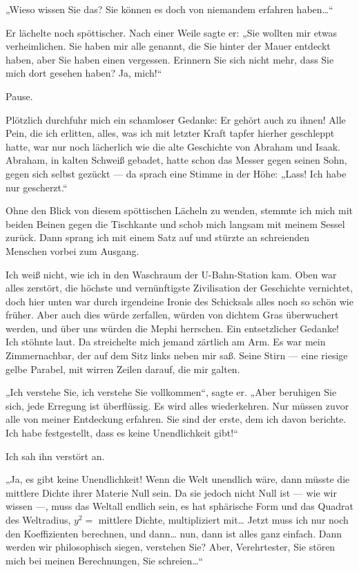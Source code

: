 „Wieso wissen Sie das? Sie
können es doch von niemandem erfahren haben\ldots{}“

Er lächelte noch spöttischer. Nach einer Weile sagte er:
%
„Sie
wollten mir etwas verheimlichen. Sie haben mir alle genannt, die
Sie hinter der Mauer entdeckt haben, aber Sie haben einen
vergessen. Erinnern Sie sich nicht mehr, dass Sie mich dort gesehen
haben? Ja, mich!“

Pause.

Plötzlich durchfuhr mich ein schamloser Gedanke: Er gehört auch zu
ihnen! Alle Pein, die ich erlitten, alles, was
ich mit letzter Kraft tapfer hierher geschleppt hatte, war nur noch
lächerlich wie die alte Geschichte von Abraham und Isaak. Abraham,
in kalten Schweiß gebadet, hatte schon das Messer gegen seinen
Sohn, gegen sich selbst gezückt — da sprach eine Stimme in der
Höhe: „Lass! Ich habe nur gescherzt.“

Ohne den Blick von diesem spöttischen Lächeln zu wenden, stemmte
ich mich mit beiden Beinen gegen die Tischkante und schob mich
langsam mit meinem Sessel zurück. Dann sprang ich mit einem Satz
auf und stürzte an schreienden Menschen vorbei zum Ausgang.

Ich
weiß nicht, wie ich in den Waschraum der U-Bahn-Station kam. Oben
war alles zerstört, die höchste und vernünftigste Zivilisation der
Geschichte vernichtet, doch hier unten war durch irgendeine Ironie
des Schicksals alles noch so schön wie früher. Aber auch dies würde
zerfallen, würden von dichtem Gras überwuchert werden, und über uns
würden die Mephi herrschen. Ein entsetzlicher Gedanke! Ich stöhnte
laut. Da streichelte mich jemand zärtlich am Arm. Es war mein
Zimmernachbar, der auf dem Sitz links neben mir saß. Seine Stirn —
eine riesige gelbe Parabel, mit wirren Zeilen darauf, die mir
galten.

„Ich verstehe Sie, ich verstehe Sie vollkommen“, sagte er.
„Aber beruhigen Sie sich, jede Erregung ist überflüssig. Es wird
alles wiederkehren. Nur müssen zuvor alle von meiner Entdeckung
erfahren. Sie sind der erste, dem ich davon berichte. Ich habe
festgestellt, dass es keine Unendlichkeit gibt!“

Ich sah ihn verstört an.

„Ja, es gibt keine Unendlichkeit! Wenn die Welt unendlich wäre,
dann müsste die mittlere Dichte ihrer Materie Null sein. Da sie
jedoch nicht Null ist — wie wir wissen —, muss das Weltall endlich
sein, es hat sphärische
Form und das Quadrat des Weltradius, $y^2 = $ mittlere Dichte,
multipliziert mit\ldots{} Jetzt muss ich nur noch den Koeffizienten
berechnen, und dann\ldots{} nun, dann ist alles ganz einfach. Dann
werden wir philosophisch siegen, verstehen Sie? Aber, Verehrtester,
Sie stören mich bei meinen Berechnungen, Sie schreien\ldots{}“


